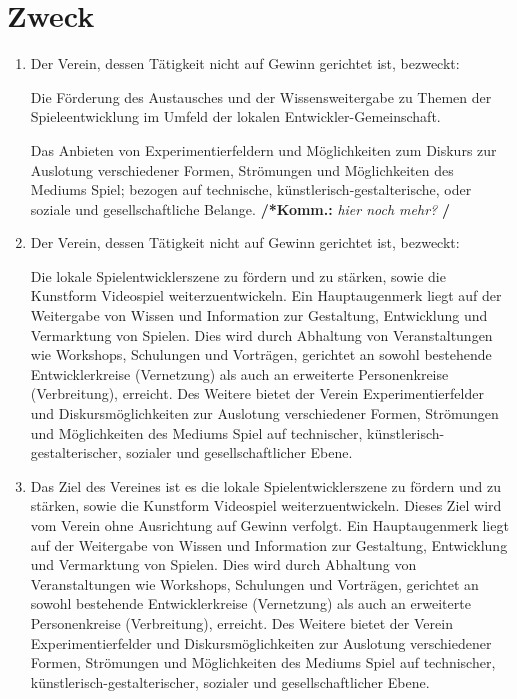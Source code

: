 \documentclass[a4paper,12pt]{article}
\newcommand{\comment}[1]{{\bf /*Komm.:} \textit{#1} {\bf */}}
\begin{document}
\section{Zweck} %
\label{sec:Zweck}
\begin{enumerate}
\item Der Verein, dessen Tätigkeit nicht auf Gewinn gerichtet ist, bezweckt:

Die Förderung des Austausches und der Wissensweitergabe zu Themen der Spieleentwicklung im Umfeld der lokalen Entwickler-Gemeinschaft.

Das Anbieten von Experimentierfeldern und Möglichkeiten zum Diskurs zur Auslotung verschiedener Formen, Strömungen und Möglichkeiten des Mediums Spiel; bezogen auf technische, künstlerisch-gestalterische, oder soziale und gesellschaftliche Belange. \comment{hier noch mehr?}

\item Der Verein, dessen T\"atigkeit nicht auf Gewinn gerichtet ist, bezweckt:

Die lokale Spielentwicklerszene zu fördern und zu stärken, sowie die Kunstform Videospiel weiterzuentwickeln.
Ein Hauptaugenmerk liegt auf der Weitergabe von Wissen und Information zur Gestaltung, Entwicklung und Vermarktung von Spielen. Dies wird durch Abhaltung von Veranstaltungen wie Workshops,
Schulungen und Vorträgen, gerichtet an sowohl bestehende Entwicklerkreise (Vernetzung) als auch an erweiterte Personenkreise (Verbreitung), erreicht.
Des Weitere bietet der Verein Experimentierfelder und Diskursmöglichkeiten zur Auslotung verschiedener Formen, Strömungen und Möglichkeiten des Mediums Spiel auf technischer, künstlerisch-gestalterischer, sozialer und gesellschaftlicher Ebene.

\item Das Ziel des Vereines ist es die lokale Spielentwicklerszene zu fördern und zu stärken, sowie die Kunstform Videospiel weiterzuentwickeln. Dieses Ziel wird vom Verein ohne Ausrichtung auf Gewinn verfolgt.
Ein Hauptaugenmerk liegt auf der Weitergabe von Wissen und Information zur Gestaltung, Entwicklung und Vermarktung von Spielen. Dies wird durch Abhaltung von Veranstaltungen wie Workshops,
Schulungen und Vorträgen, gerichtet an sowohl bestehende Entwicklerkreise (Vernetzung) als auch an erweiterte Personenkreise (Verbreitung), erreicht.
Des Weitere bietet der Verein Experimentierfelder und Diskursmöglichkeiten zur Auslotung verschiedener Formen, Strömungen und Möglichkeiten des Mediums Spiel auf technischer, künstlerisch-gestalterischer, sozialer und gesellschaftlicher Ebene.

\end{enumerate}
\end{document}
